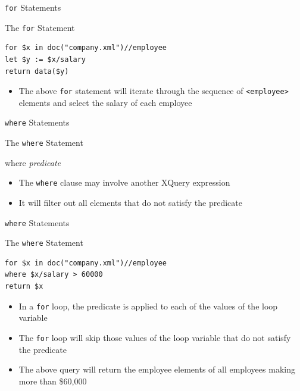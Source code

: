 \documentclass[svgnames]{beamer}
\begin{document}
\begin{frame}[fragile]{\texttt{for} Statements}
\small
\begin{block}{The \texttt{for} Statement}
\begin{verbatim}
for $x in doc("company.xml")//employee
let $y := $x/salary
return data($y)
\end{verbatim}
\end{block}
\normalsize
\begin{itemize}
	\item The above \texttt{for} statement will iterate through the sequence of \texttt{<employee>} elements and select the salary of each employee
\end{itemize}
\end{frame}

\begin{frame}[fragile]{\texttt{where} Statements}
\small
\begin{block}{The \texttt{where} Statement}
\begin{semiverbatim}
where \textit{predicate}
\end{semiverbatim}
\end{block}
\normalsize
\begin{itemize}
	\item The \texttt{where} clause may involve another XQuery expression
	\item It will filter out all elements that do not satisfy the predicate
\end{itemize}
\end{frame}

\begin{frame}[fragile]{\texttt{where} Statements}
\small
\begin{block}{The \texttt{where} Statement}
\begin{verbatim}
for $x in doc("company.xml")//employee
where $x/salary > 60000
return $x
\end{verbatim}
\end{block}
\normalsize
\begin{itemize}
	\item In a \texttt{for} loop, the predicate is applied to each of the values of the loop variable
	\item The \texttt{for} loop will skip those values of the loop variable that do not satisfy the predicate
	\item The above query will return the employee elements of all employees making more than \$60,000
\end{itemize}
\end{frame}
\end{document}
